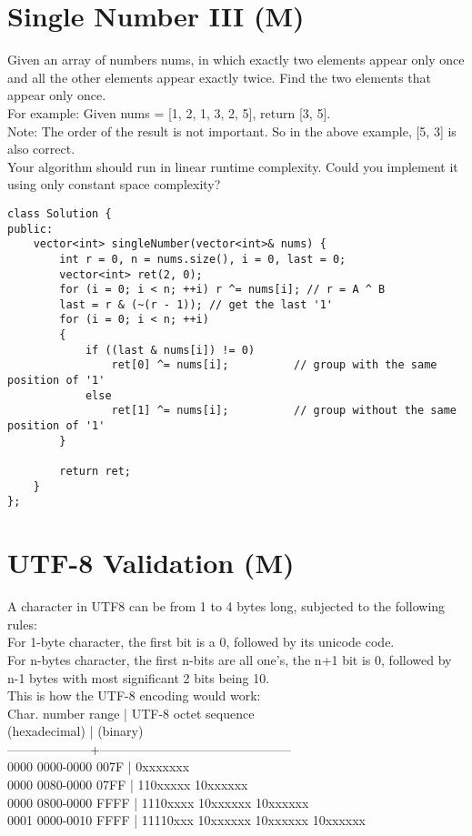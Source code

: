 \section{Single Number III (M)}
Given an array of numbers nums, in which exactly two elements appear only once and all the other elements appear exactly twice. Find the two elements that appear only once. \\

For example: Given nums = [1, 2, 1, 3, 2, 5], return [3, 5].\\

Note:
    The order of the result is not important. So in the above example, [5, 3] is also correct.\\
    Your algorithm should run in linear runtime complexity. Could you implement it using only constant space complexity?\\

\begin{lstlisting}
class Solution {
public:
    vector<int> singleNumber(vector<int>& nums) {
        int r = 0, n = nums.size(), i = 0, last = 0;
        vector<int> ret(2, 0);
        for (i = 0; i < n; ++i) r ^= nums[i]; // r = A ^ B
        last = r & (~(r - 1)); // get the last '1'
        for (i = 0; i < n; ++i)
        {
            if ((last & nums[i]) != 0)
                ret[0] ^= nums[i];          // group with the same position of '1'
            else
                ret[1] ^= nums[i];          // group without the same position of '1'
        }

        return ret;
    }
};
\end{lstlisting}


\section{UTF-8 Validation (M)}
A character in UTF8 can be from 1 to 4 bytes long, subjected to the following rules:\\
    For 1-byte character, the first bit is a 0, followed by its unicode code.\\
    For n-bytes character, the first n-bits are all one's, the n+1 bit is 0, followed by n-1 bytes with most significant 2 bits being 10.\\

This is how the UTF-8 encoding would work:\\
   Char. number range  |        UTF-8 octet sequence\\
      (hexadecimal)    |              (binary)\\
   --------------------+---------------------------------------------\\
   0000 0000-0000 007F | 0xxxxxxx\\
   0000 0080-0000 07FF | 110xxxxx 10xxxxxx\\
   0000 0800-0000 FFFF | 1110xxxx 10xxxxxx 10xxxxxx\\
   0001 0000-0010 FFFF | 11110xxx 10xxxxxx 10xxxxxx 10xxxxxx\\

